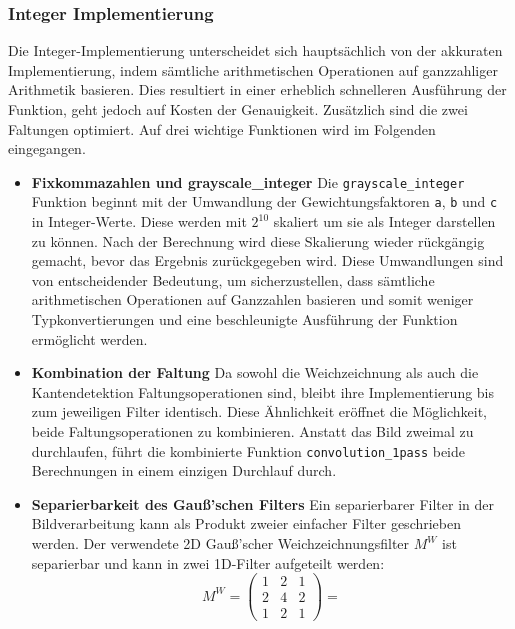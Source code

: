 \documentclass[course=erap]{aspdoc}
\begin{document}
\subsubsection{Integer Implementierung}
Die Integer-Implementierung unterscheidet sich hauptsächlich von der akkuraten Implementierung, indem sämtliche arithmetischen Operationen auf ganzzahliger Arithmetik basieren. Dies resultiert in einer erheblich schnelleren Ausführung der Funktion, geht jedoch auf Kosten der Genauigkeit. Zusätzlich sind die zwei Faltungen optimiert. Auf drei wichtige Funktionen wird im Folgenden eingegangen.
\begin{itemize}
\item \textbf{Fixkommazahlen und grayscale\_integer}\newline
Die \texttt{grayscale\_integer} Funktion beginnt mit der Umwandlung der Gewichtungsfaktoren \texttt{a}, \texttt{b} und \texttt{c} in Integer-Werte. Diese werden mit $2^{10}$ skaliert um sie als Integer darstellen zu können. Nach der Berechnung wird diese Skalierung wieder rückgängig gemacht, bevor das Ergebnis zurückgegeben wird.
Diese Umwandlungen sind von entscheidender Bedeutung, um sicherzustellen, dass sämtliche arithmetischen Operationen auf Ganzzahlen basieren und somit weniger Typkonvertierungen und eine beschleunigte Ausführung der Funktion ermöglicht werden.
\item \textbf{Kombination der Faltung}\newline
Da sowohl die Weichzeichnung als auch die Kantendetektion Faltungsoperationen sind, bleibt ihre Implementierung bis zum jeweiligen Filter identisch. Diese Ähnlichkeit eröffnet die Möglichkeit, beide Faltungsoperationen zu kombinieren. Anstatt das Bild zweimal zu durchlaufen, führt die kombinierte Funktion \texttt{convolution\_1pass} beide Berechnungen in einem einzigen Durchlauf durch.
\item \textbf{Separierbarkeit des Gauß'schen Filters}\newline
Ein separierbarer Filter in der Bildverarbeitung kann als Produkt zweier einfacher Filter geschrieben werden. Der verwendete 2D Gauß'scher Weichzeichnungsfilter $M^W$ ist separierbar und kann in zwei 1D-Filter aufgeteilt werden:
\[
         M^W = \begin{pmatrix} 1 & 2 & 1 \\ 2 & 4 & 2 \\ 1 & 2 & 1 \end{pmatrix} = 
\]
\end{itemize}
\end{document}
